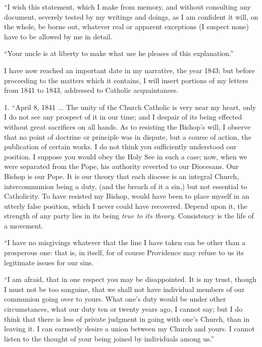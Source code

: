 ``I wish this statement, which I make from memory, and without
consulting any document, severely tested by my writings and doings, as I
am confident it will, on the whole, be borne out, whatever real or
apparent exceptions (I suspect none) have to be allowed by me in detail.

``Your uncle is at liberty to make what use he pleases of this
explanation.''

I have now reached an important date in my narrative, the year 1843;
but before proceeding to the matters which it contains, I will insert
portions of my letters from 1841 to 1843, addressed to Catholic
acquaintances.

1. ``April 8, 1841 ... The unity of the Church Catholic is very
near my heart, only I do not see any prospect of it in our time; and I
despair of its being effected without great sacrifices on all hands. As
to resisting the Bishop's will, I observe that no point of doctrine or
principle was in dispute, but a course of action, the publication of
certain works. I do not think you sufficiently understood our position.
I suppose you would obey the Holy See in such a case; now, when we were
separated from the Pope, his authority reverted to our Diocesans. Our
Bishop is our Pope. It is our theory that each diocese is an integral
Church, intercommunion being a duty, (and the breach of it a sin,)
but not essential to Catholicity. To have resisted my Bishop, would have
been to place myself in an utterly false position, which I never could
have recovered. Depend upon it, the strength of any party lies in its
being \emph{true to its theory}. Consistency is the life of a movement.

``I have no misgivings whatever that the line I have taken can be
other than a prosperous one: that is, in itself, for of course
Providence may refuse to us its legitimate issues for our sins.

``I am afraid, that in one respect you may be disappointed. It is
my trust, though I must not be too sanguine, that we shall not have
individual members of our communion going over to yours. What one's duty
would be under other circumstances, what our duty ten or twenty years
ago, I cannot say; but I do think that there is less of private judgment
in going with one's Church, than in leaving it. I can earnestly desire a
union between my Church and yours. I cannot listen to the thought of
your being joined by individuals among us.''

